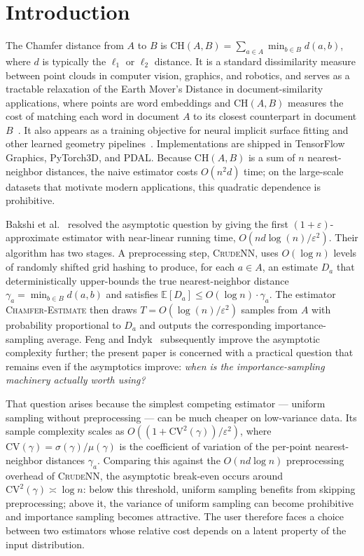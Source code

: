 \documentclass[conference]{IEEEtran}
\begin{document}
\section{Introduction}
\label{sec:intro}

The Chamfer distance from $A$ to $B$ is
$\mathrm{CH}(A, B) = \sum_{a \in A} \min_{b \in B} d(a, b)$,
where $d$ is typically the $\ell_1$ or $\ell_2$ distance. It is a
standard dissimilarity measure between point clouds in computer vision,
graphics, and robotics, and serves as a tractable relaxation of the
Earth Mover's Distance in document-similarity applications, where
points are word embeddings and $\mathrm{CH}(A, B)$ measures the cost of
matching each word in document $A$ to its closest counterpart in
document $B$~\cite{kusner2015wmd}. It also appears as a training
objective for neural implicit surface fitting and other learned
geometry pipelines~\cite{diffcd2024}. Implementations are shipped in
TensorFlow Graphics, PyTorch3D, and PDAL. Because $\mathrm{CH}(A, B)$
is a sum of $n$ nearest-neighbor distances, the naive estimator costs
$O(n^2 d)$ time; on the large-scale datasets that motivate modern
applications, this quadratic dependence is prohibitive.

Bakshi et al.~\cite{bakshi2023near} resolved the asymptotic question by
giving the first $(1{+}\varepsilon)$-approximate estimator with
near-linear running time, $O(nd \log(n)/\varepsilon^2)$. Their
algorithm has two stages. A preprocessing step, \textsc{CrudeNN}, uses
$O(\log n)$ levels of randomly shifted grid hashing to produce, for
each $a \in A$, an estimate $D_a$ that deterministically upper-bounds
the true nearest-neighbor distance
$\gamma_a = \min_{b \in B} d(a, b)$ and satisfies
$\mathbb{E}[D_a] \leq O(\log n) \cdot \gamma_a$. The estimator
\textsc{Chamfer-Estimate} then draws $T = O(\log(n)/\varepsilon^2)$
samples from $A$ with probability proportional to $D_a$ and outputs
the corresponding importance-sampling average. Feng and
Indyk~\cite{feng2025faster} subsequently improve the asymptotic
complexity further; the present paper is concerned with a practical
question that remains even if the asymptotics improve: \emph{when is
the importance-sampling machinery actually worth using?}

That question arises because the simplest competing estimator ---
uniform sampling without preprocessing --- can be much cheaper on
low-variance data. Its sample complexity scales as
$O((1+\mathrm{CV}^2(\gamma))/\varepsilon^2)$, where
$\mathrm{CV}(\gamma) = \sigma(\gamma)/\mu(\gamma)$ is the coefficient
of variation of the per-point nearest-neighbor distances $\gamma_a$.
Comparing this against the $O(nd \log n)$ preprocessing overhead of
\textsc{CrudeNN}, the asymptotic break-even occurs around
$\mathrm{CV}^2(\gamma) \asymp \log n$: below this threshold, uniform
sampling benefits from skipping preprocessing; above it, the variance
of uniform sampling can become prohibitive and importance sampling
becomes attractive. The user therefore faces a choice between two
estimators whose relative cost depends on a latent property of the
input distribution.
\end{document}
